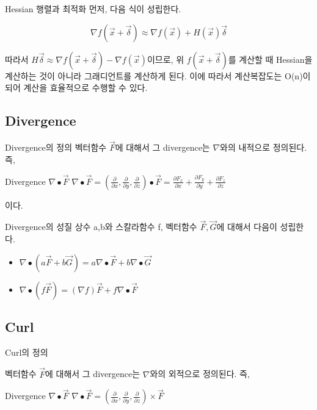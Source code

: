 \documentclass{beamer}
\begin{document}
\begin{frame}[allowframebreaks]{Hessian 행렬과 최적화}
먼저, 다음 식이 성립한다. 

\begin{equation} 
\nabla f(\vec{x} + \vec{\delta}) \approx \nabla f(\vec{x}) + H(\vec{x})\vec{\delta}
\end{equation} 

따라서 $H \vec{\delta} \approx \nabla f(\vec{x} + \vec{\delta}) - \nabla f(\vec{x}) $이므로, 위 $f(\vec{x} + \vec{\delta})$를 계산할 때 Hessian을 계산하는 것이 아니라 그래디언트를 계산하게 된다. 이에 따라서 계산복잡도는 O(n)이 되어 계산을 효율적으로 수행할 수 있다. 


\end{frame}



\subsection{Divergence} 

\begin{frame}{Divergence의 정의} 
벡터함수 $\vec{F}$에 대해서 그 divergence는 $\nabla$와의 내적으로 정의된다. 즉, 

\begin{block}{Divergence $\nabla \bullet \vec{F}$}
$\nabla \bullet \vec{F} = (\frac{\partial}{\partial x}, \frac{\partial}{\partial y}, \frac{\partial}{\partial z} ) \bullet \vec{F} = \frac{\partial F_x}{\partial x} +  \frac{\partial F_y}{\partial y} + \frac{\partial F_z}{\partial z}$
\end{block}

이다. 
\end{frame}

\begin{frame}{Divergence의 성질} 
상수 a,b와 스칼라함수 f, 벡터함수 $\vec{F}, \vec{G}$에 대해서 다음이 성립한다. 
\begin{itemize} 
\item $\nabla \bullet (a\vec{F} + b\vec{G}) = a \nabla \bullet \vec{F} + b \nabla \bullet \vec{G}$
\item $\nabla \bullet (f \vec{F}) = (\nabla f) \vec{F}  + f \nabla \bullet \vec{F}$
\end{itemize}
\end{frame}


\subsection{Curl}

\begin{frame}{Curl의 정의} 

벡터함수 $\vec{F}$에 대해서 그 divergence는 $\nabla$와의 외적으로 정의된다. 즉, 
\begin{block}{Divergence $\nabla \bullet \vec{F}$}
$\nabla \bullet \vec{F} = (\frac{\partial}{\partial x}, \frac{\partial}{\partial y}, \frac{\partial}{\partial z} ) \times \vec{F}$\end{block}
\end{frame}
\end{document}
